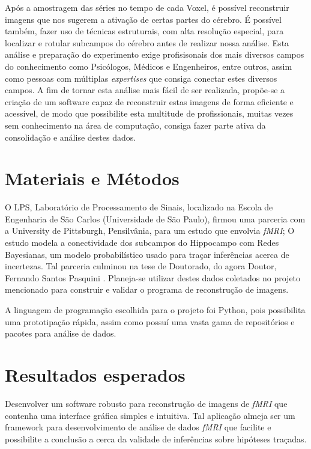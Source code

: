 \documentclass[11pt,a4paper]{report}
\begin{document}
Após a amostragem das séries no tempo de cada Voxel, é possível reconstruir imagens que nos sugerem a ativação de certas partes do cérebro. É possível também, fazer uso de técnicas estruturais, com alta resolução especial, para localizar e rotular subcampos do cérebro antes de realizar nossa análise. Esta análise e preparação do experimento exige profisisonais dos mais diversos campos do conhecimento como Psicólogos, Médicos e Engenheiros, entre outros, assim como pessoas com múltiplas \emph{expertises} que consiga conectar estes diversos campos. A fim de tornar esta análise mais fácil de ser realizada, propõe-se a criação de um software capaz de reconstruir estas imagens de forma eficiente e acessível, de modo que possibilite esta multitude de profissionais, muitas vezes sem conhecimento na área de computação, consiga fazer parte ativa da consolidação e análise destes dados.

\section*{Materiais e Métodos}

O LPS, Laboratório de Processamento de Sinais, localizado na Escola de Engenharia de São Carlos (Universidade de São Paulo), firmou uma parceria com a University de Pittsburgh, Pensilvânia, para um estudo que envolvia \emph{fMRI}; O estudo modela a conectividade dos subcampos do Hippocampo com Redes Bayesianas, um modelo probabilístico usado para traçar inferências acerca de incertezas. Tal parceria culminou na tese de Doutorado, do agora Doutor, Fernando Santos Pasquini \cite{Santos2017}. Planeja-se utilizar destes dados coletados no projeto mencionado para construir e validar o programa de reconstrução de imagens.

A linguagem de programação escolhida para o projeto foi Python, pois possibilita uma prototipação rápida, assim como possuí uma vasta gama de repositórios e pacotes para análise de dados.

\section*{Resultados esperados}
Desenvolver um software robusto para reconstrução de imagens de \emph{fMRI} que contenha uma interface gráfica simples e intuitiva. Tal aplicação almeja ser um framework para desenvolvimento de análise de dados \emph{fMRI} que facilite e possibilite a conclusão a cerca da validade de inferências sobre hipóteses traçadas.



\end{document}
